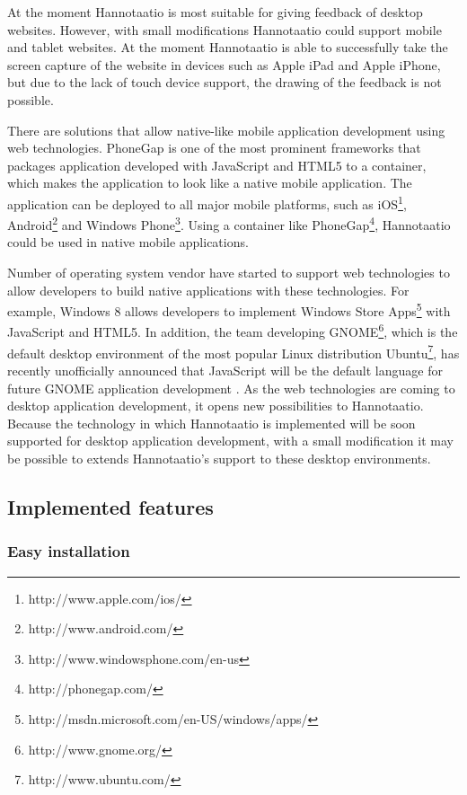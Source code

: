 \documentclass[english,12pt,a4paper,pdftex]{article}
\begin{document}
At the moment Hannotaatio is most suitable for giving feedback of desktop websites. However, with small modifications Hannotaatio could support mobile and tablet websites. At the moment Hannotaatio is able to successfully take the screen capture of the website in devices such as Apple iPad and Apple iPhone, but due to the lack of touch device support, the drawing of the feedback is not possible.

There are solutions that allow native-like mobile application development using web technologies. PhoneGap is one of the most prominent frameworks that packages application developed with JavaScript and HTML5 to a container, which makes the application to look like a native mobile application. The application can be deployed to all major mobile platforms, such as iOS\footnote{http://www.apple.com/ios/}, Android\footnote{http://www.android.com/} and Windows Phone\footnote{http://www.windowsphone.com/en-us}. Using a container like PhoneGap\footnote{http://phonegap.com/}, Hannotaatio could be used in native mobile applications.

Number of operating system vendor have started to support web technologies to allow developers to build native applications with these technologies. For example, Windows 8 allows developers to implement Windows Store Apps\footnote{http://msdn.microsoft.com/en-US/windows/apps/} with JavaScript and HTML5. In addition, the team developing GNOME\footnote{http://www.gnome.org/}, which is the default desktop environment of the most popular Linux distribution Ubuntu\footnote{http://www.ubuntu.com/}, has recently unofficially announced that JavaScript will be the default language for future GNOME application development \citep{treitter2013}. As the web technologies are coming to desktop application development, it opens new possibilities to Hannotaatio. Because the technology in which Hannotaatio is implemented will be soon supported for desktop application development, with a small modification it may be possible to extends Hannotaatio's support to these desktop environments.

\subsection{Implemented features}

\subsubsection{Easy installation}
\end{document}
